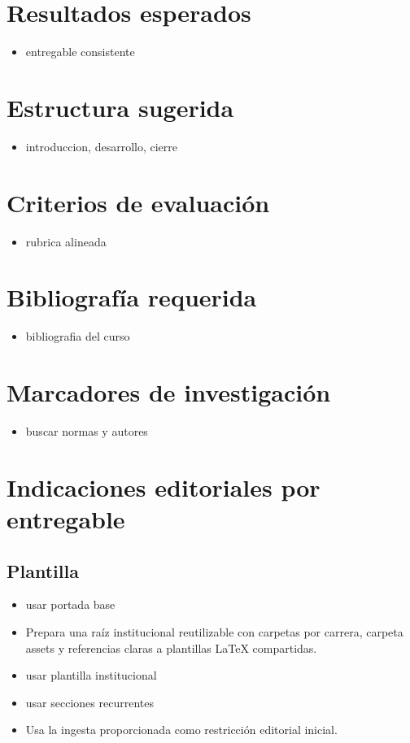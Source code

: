 \documentclass[12pt]{article}
\begin{document}
\section*{Resultados esperados}
\begin{itemize}[leftmargin=*]
  \item entregable consistente
\end{itemize}

\section*{Estructura sugerida}
\begin{itemize}[leftmargin=*]
  \item introduccion, desarrollo, cierre
\end{itemize}

\section*{Criterios de evaluación}
\begin{itemize}[leftmargin=*]
  \item rubrica alineada
\end{itemize}

\section*{Bibliografía requerida}
\begin{itemize}[leftmargin=*]
  \item bibliografia del curso
\end{itemize}

\section*{Marcadores de investigación}
\begin{itemize}[leftmargin=*]
  \item buscar normas y autores
\end{itemize}

\section*{Indicaciones editoriales por entregable}

\subsection*{Plantilla}
\begin{itemize}[leftmargin=*]
  \item usar portada base
  \item Prepara una raíz institucional reutilizable con carpetas por carrera, carpeta assets y referencias claras a plantillas LaTeX compartidas.
  \item usar plantilla institucional
  \item usar secciones recurrentes
  \item Usa la ingesta proporcionada como restricción editorial inicial.
\end{itemize}
\end{document}

